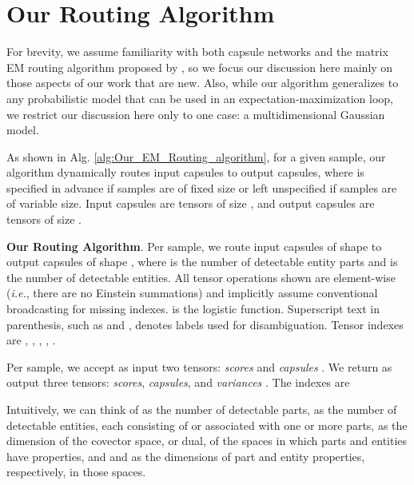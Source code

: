 \documentclass[11pt,a4paper]{article}
\begin{document}
\section{Our Routing Algorithm}\label{sec:our_routing_algorithm}

For brevity, we assume familiarity with both capsule networks and the matrix EM routing algorithm proposed by \citet{46653}, so we focus our discussion here mainly on those aspects of our work that are new. Also, while our algorithm generalizes to any probabilistic model that can be used in an expectation-maximization loop, we restrict our discussion here only to one case: a multidimensional Gaussian model.

As shown in Alg. \ref{alg:Our_EM_Routing_algorithm}, for a given sample, our algorithm dynamically routes  input capsules to  output capsules, where  is specified in advance if samples are of fixed size or left unspecified if samples are of variable size. Input capsules are tensors of size , and output capsules are tensors of size .

\begin{algorithm*}
	\caption{\textbf{Our Routing Algorithm}. Per sample, we route  input capsules of shape  to  output capsules of shape , where  is the number of detectable entity parts and  is the number of detectable entities. All tensor operations shown are element-wise ({\em i.e.}, there are no Einstein summations) and implicitly assume conventional broadcasting for missing indexes.  is the logistic function. Superscript text in parenthesis, such as  and , denotes labels used for disambiguation. Tensor indexes are , , , , .}
	\label{alg:Our_EM_Routing_algorithm}
	\KwIn{}
	\KwOut{}
	\BlankLine
	\;
\end{algorithm*}

Per sample, we accept as input two tensors: \emph{scores} and \emph{capsules} . We return as output three tensors: \emph{scores}, \emph{capsules}, and \emph{variances} . The indexes are



Intuitively, we can think of  as the number of detectable parts,  as the number of detectable entities, each consisting of or associated with one or more parts,  as the dimension of the covector space, or dual, of the spaces in which parts and entities have properties, and  and  as the dimensions of part and entity properties, respectively, in those spaces.
\end{document}
